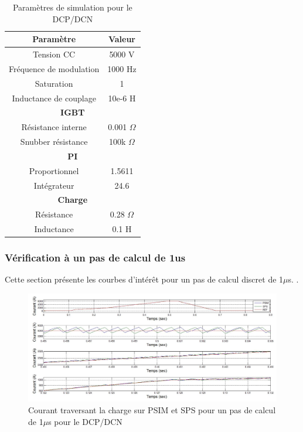 \documentclass[11pt,letterpaper,final]{report}
\begin{document}
\begin{table}[htb]
\centering
\begin{tabular}{|c|c|} 
  \hline
  Paramètre & Valeur  \\
  \hline\hline
  Tension CC & 5000 V\\ \hline
  Fréquence de modulation & 1000 Hz\\ \hline
  Saturation & 1 \\ \hline
  Inductance de couplage & 10e-6 H \\ \hline \hline
  \multicolumn{2}{|c|}{\textbf{IGBT}}\\ \hline
  Résistance interne & 0.001 $\Omega$\\
  Snubber résistance & 100k $\Omega$\\ \hline \hline
   \multicolumn{2}{|c|}{\textbf{PI}}\\ \hline
  Proportionnel & 1.5611 \\
  Intégrateur & 24.6 \\ \hline \hline
  \multicolumn{2}{|c|}{\textbf{Charge}}\\ \hline
  Résistance & 0.28 $\Omega$\\
  Inductance & 0.1 H \\
  \hline
\end{tabular}
\caption{Paramètres de simulation pour le DCP/DCN}
\label{p_DCP}
\end{table}


\subsubsection{Vérification à un pas de calcul de 1us}
Cette section présente les courbes d'intérêt pour un pas de calcul discret de 1$\mu$s. .



\begin{figure}[htb]
\centering
\includegraphics[scale=0.5]{Fig/DCPDCN/DCPCourantCharge1u.jpg}
\caption{Courant traversant la charge sur PSIM et SPS pour un pas de calcul de 1$\mu$s pour le DCP/DCN}
\label{DC_ch_cou_1}
\end{figure}
\end{document}
